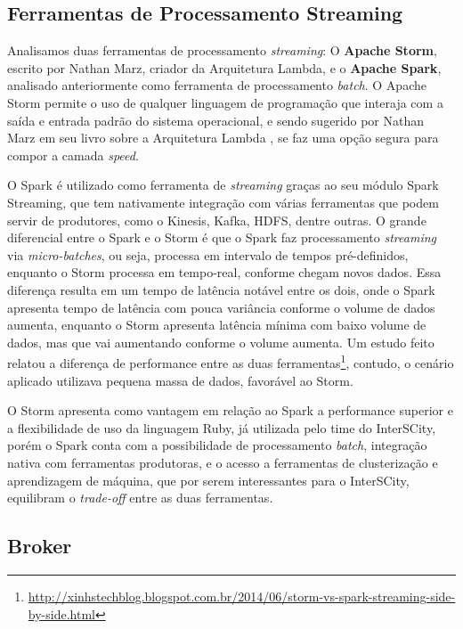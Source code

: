 
\subsection{Ferramentas de Processamento Streaming}

Analisamos duas ferramentas de processamento \textit{streaming}: O
\textbf{Apache Storm}, escrito por Nathan Marz, criador da Arquitetura
Lambda, e o \textbf{Apache Spark}, analisado anteriormente como ferramenta de
processamento \textit{batch}. O Apache Storm permite o uso de qualquer
linguagem de programação que interaja com a saída e entrada padrão do sistema
operacional, e sendo sugerido por Nathan Marz em seu livro sobre a Arquitetura
Lambda \cite{marz2015}, se faz uma opção segura para compor a camada
\textit{speed}.

O Spark é utilizado como ferramenta de \textit{streaming} graças ao seu módulo
Spark Streaming, que tem nativamente integração com várias ferramentas que
podem servir de produtores, como o Kinesis, Kafka, HDFS, dentre outras. O
grande diferencial entre o Spark e o Storm é que o Spark faz processamento
\textit{streaming} via \textit{micro-batches}, ou seja, processa em intervalo
de tempos pré-definidos, enquanto o Storm processa em tempo-real, conforme
chegam novos dados. Essa diferença resulta em um tempo de latência notável
entre os dois, onde o Spark apresenta tempo de latência com pouca variância
conforme o volume de dados aumenta, enquanto o Storm apresenta latência mínima
com baixo volume de dados, mas que vai aumentando conforme o volume aumenta.
Um estudo feito relatou a diferença de performance entre as duas
ferramentas\footnote{\url{http://xinhstechblog.blogspot.com.br/2014/06/storm-vs-spark-streaming-side-by-side.html}},
contudo, o cenário aplicado utilizava pequena massa de dados, favorável ao
Storm.

O Storm apresenta como vantagem em relação ao Spark a performance
superior e a flexibilidade de uso da linguagem Ruby, já utilizada pelo time
do InterSCity, porém o Spark conta com a possibilidade de processamento
\textit{batch}, integração nativa com ferramentas produtoras, e o acesso a
ferramentas de clusterização e aprendizagem de máquina, que por serem
interessantes para o InterSCity, equilibram o \textit{trade-off} entre as
duas ferramentas.

\subsection{Broker}

